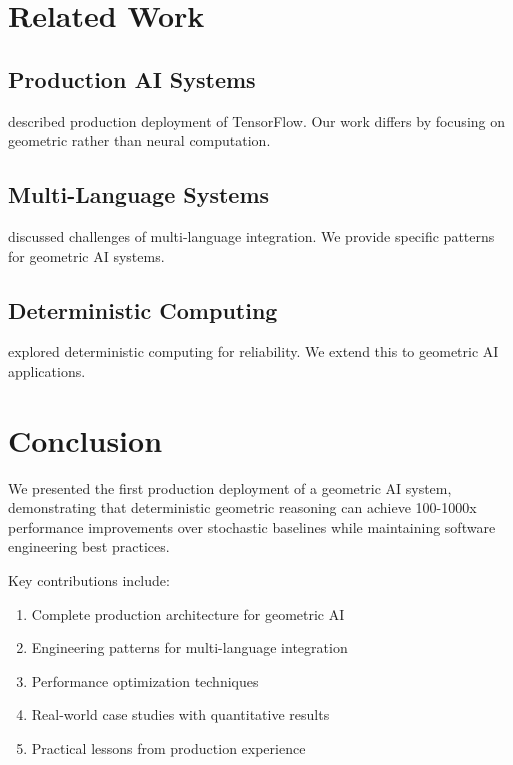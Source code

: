 \documentclass{article}
\begin{document}
\section{Related Work}

\subsection{Production AI Systems}

\citet{tensorflow2015} described production deployment of TensorFlow. Our work differs by focusing on geometric rather than neural computation.

\subsection{Multi-Language Systems}

\citet{multilang2018} discussed challenges of multi-language integration. We provide specific patterns for geometric AI systems.

\subsection{Deterministic Computing}

\citet{deterministic2020} explored deterministic computing for reliability. We extend this to geometric AI applications.

\section{Conclusion}

We presented the first production deployment of a geometric AI system, demonstrating that deterministic geometric reasoning can achieve 100-1000x performance improvements over stochastic baselines while maintaining software engineering best practices.

Key contributions include:
\begin{enumerate}
    \item Complete production architecture for geometric AI
    \item Engineering patterns for multi-language integration
    \item Performance optimization techniques
    \item Real-world case studies with quantitative results
    \item Practical lessons from production experience
\end{enumerate}
\end{document}

